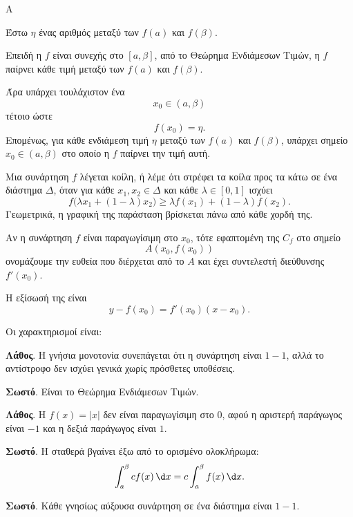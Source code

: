 \begin{thema}{Α}
\begin{erwthma}
\item Έστω $\eta$ ένας αριθμός μεταξύ των $f(a)$ και $f(\beta)$.

Επειδή η $f$ είναι συνεχής στο $[a,\beta]$, από το Θεώρημα Ενδιάμεσων Τιμών, η $f$ παίρνει κάθε τιμή μεταξύ των $f(a)$ και $f(\beta)$.

Άρα υπάρχει τουλάχιστον ένα
\[
x_0\in(a,\beta)
\]
τέτοιο ώστε
\[
f(x_0)=\eta.
\]
Επομένως, για κάθε ενδιάμεση τιμή $\eta$ μεταξύ των $f(a)$ και $f(\beta)$, υπάρχει σημείο $x_0\in(a,\beta)$ στο οποίο η $f$ παίρνει την τιμή αυτή.

\item Μια συνάρτηση $f$ λέγεται κοίλη, ή λέμε ότι στρέφει τα κοίλα προς τα κάτω σε ένα διάστημα $\varDelta$, όταν για κάθε $x_1,x_2\in\varDelta$ και κάθε $\lambda\in[0,1]$ ισχύει
\[
f\bigl(\lambda x_1+(1-\lambda)x_2\bigr)
\geq
\lambda f(x_1)+(1-\lambda)f(x_2).
\]
Γεωμετρικά, η γραφική της παράσταση βρίσκεται πάνω από κάθε χορδή της.

\item Αν η συνάρτηση $f$ είναι παραγωγίσιμη στο $x_0$, τότε εφαπτομένη της $C_f$ στο σημείο
\[
A(x_0,f(x_0))
\]
ονομάζουμε την ευθεία που διέρχεται από το $A$ και έχει συντελεστή διεύθυνσης $f'(x_0)$.

Η εξίσωσή της είναι
\[
y-f(x_0)=f'(x_0)(x-x_0).
\]

\item Οι χαρακτηρισμοί είναι:
\begin{alist}
\item \textbf{Λάθος}. Η γνήσια μονοτονία συνεπάγεται ότι η συνάρτηση είναι $1-1$, αλλά το αντίστροφο δεν ισχύει γενικά χωρίς πρόσθετες υποθέσεις.
\item \textbf{Σωστό}. Είναι το Θεώρημα Ενδιάμεσων Τιμών.
\item \textbf{Λάθος}. Η $f(x)=|x|$ δεν είναι παραγωγίσιμη στο $0$, αφού η αριστερή παράγωγος είναι $-1$ και η δεξιά παράγωγος είναι $1$.
\item \textbf{Σωστό}. Η σταθερά βγαίνει έξω από το ορισμένο ολοκλήρωμα:
\[
\dint_a^\beta cf(x)\,\d x
=c\dint_a^\beta f(x)\,\d x.
\]
\item \textbf{Σωστό}. Κάθε γνησίως αύξουσα συνάρτηση σε ένα διάστημα είναι $1-1$.
\end{alist}
\end{erwthma}
\end{thema}

